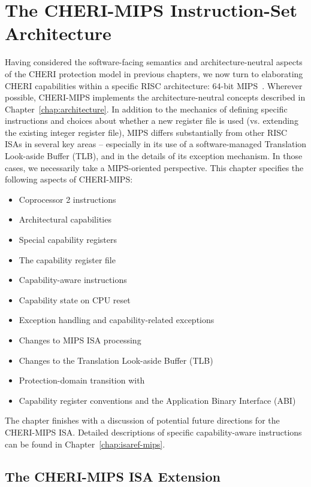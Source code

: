 \chapter{The CHERI-MIPS Instruction-Set Architecture}
\label{chap:cheri-mips}

Having considered the software-facing semantics and architecture-neutral
aspects of the CHERI protection model in previous chapters, we now turn to
elaborating CHERI capabilities within a specific RISC architecture: 64-bit
MIPS~\cite{Heinrich:1993:MRU:154056}.
Wherever possible, CHERI-MIPS implements the architecture-neutral concepts
described in Chapter~\ref{chap:architecture}.
In addition to the mechanics of defining specific instructions and choices
about whether a new register file is used (vs. extending the existing integer
register file), MIPS differs substantially from other RISC ISAs in several
key areas -- especially in its use of a software-managed Translation Look-aside
Buffer (TLB), and in the details of its exception mechanism.
In those cases, we necessarily take a MIPS-oriented perspective.
This chapter specifies the following aspects of CHERI-MIPS:

\begin{itemize}
\item Coprocessor 2 instructions
\item Architectural capabilities
\item Special capability registers
\item The capability register file
\item Capability-aware instructions
\item Capability state on CPU reset
\item Exception handling and capability-related exceptions
\item Changes to MIPS ISA processing
\item Changes to the Translation Look-aside Buffer (TLB)
\item Protection-domain transition with 
\item Capability register conventions and the Application Binary Interface (ABI)
\end{itemize}

\noindent
The chapter finishes with a discussion of potential future directions for
the CHERI-MIPS ISA.
Detailed descriptions of specific capability-aware instructions can be found
in Chapter~\ref{chap:isaref-mips}.

\section{The CHERI-MIPS ISA Extension}

